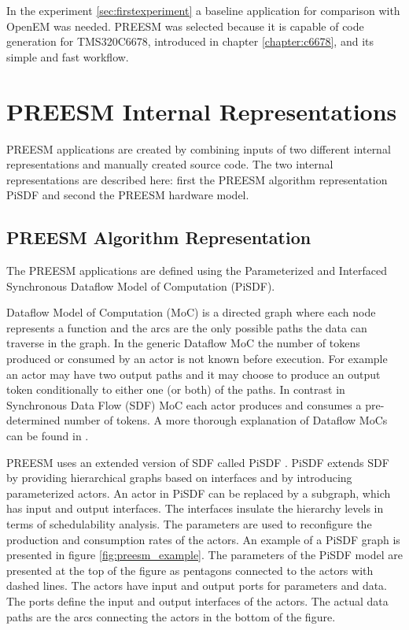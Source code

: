 In the experiment \ref{sec:firstexperiment} a baseline application for comparison
with OpenEM was needed. PREESM was selected because it is capable of code
generation for TMS320C6678, introduced in chapter \ref{chapter:c6678}, and its
simple and fast workflow.

\section{PREESM Internal Representations}
\label{sec:dataflow}
PREESM applications are created by combining inputs of two different
internal representations and manually created source code. The two internal
representations are described here: first the PREESM algorithm representation
PiSDF and second the PREESM hardware model.

\subsection{PREESM Algorithm Representation}
The PREESM applications are defined using the Parameterized and Interfaced
Synchronous Dataflow Model of Computation (PiSDF)\cite{pelcat2014preesm}.

Dataflow Model of Computation (MoC) is a directed graph where each node
represents a function and the arcs are the only possible paths the data can
traverse in the graph. In the generic Dataflow MoC the number of tokens produced
or consumed by an actor is not known before execution. For example an actor may
have two output paths and it may choose to produce an output token conditionally
to either one (or both) of the paths. In contrast in Synchronous Data Flow
(SDF) MoC each actor produces and consumes a pre-determined number of tokens.
\cite{lee1987synchronous} A more thorough explanation of Dataflow MoCs can be
found in \cite{lee2015introduction}.

PREESM uses an extended version of SDF called PiSDF \cite{pelcat2014preesm}.
PiSDF extends SDF by providing hierarchical graphs based on interfaces and by
introducing parameterized actors. An actor in PiSDF can be replaced by a
subgraph, which has input and output interfaces. The interfaces insulate the
hierarchy levels in terms of schedulability analysis. The parameters are used
to reconfigure the production and consumption rates of the actors.
\cite{desnos2013pimm} An example of a PiSDF graph is presented in figure
\ref{fig:preesm_example}. The parameters of the PiSDF model are presented at
the top of the figure as pentagons connected to the actors with dashed lines.
The actors have input and output ports for parameters and data. The ports
define the input and output interfaces of the actors. The actual data paths are
the arcs connecting the actors in the bottom of the figure.

